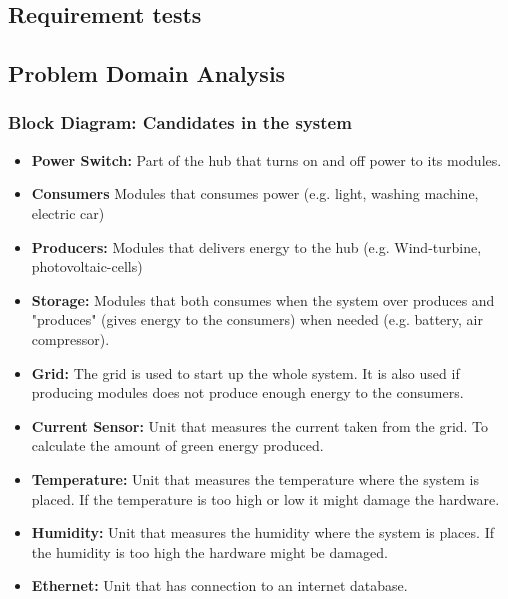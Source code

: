 \subsection{Requirement tests}


\subsection{Problem Domain Analysis}

\subsubsection{Block Diagram: Candidates in the system}
\begin{itemize}
	\item \textbf{Power Switch:} Part of the hub that turns on and off power to its modules.
	\item \textbf{Consumers} Modules that consumes power (e.g. light, washing machine, electric car)
	\item \textbf{Producers:} Modules that delivers energy to the hub (e.g. Wind-turbine, photovoltaic-cells)
	\item \textbf{Storage:} Modules that both consumes when the system over produces and "produces" (gives energy to the consumers) when needed (e.g. battery, air compressor). 
	\item \textbf{Grid:} The grid is used to start up the whole system. It is also used if producing modules does not produce enough energy to the consumers.
	\item \textbf{Current Sensor:} Unit that measures the current taken from the grid. To calculate the amount of green energy produced.
	\item \textbf{Temperature:} Unit that measures the temperature where the system is placed. If the temperature is too high or low it might damage the hardware.
	\item \textbf{Humidity:} Unit that measures the humidity where the system is places. If the humidity is too high the hardware might be damaged.
	\item \textbf{Ethernet:} Unit that has connection to an internet database.
\end{itemize}
